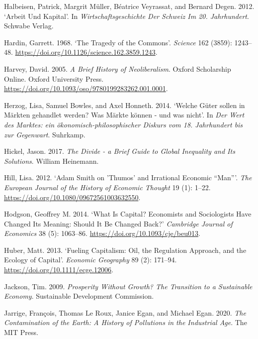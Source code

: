 \documentclass[
  british,
  a4paper,
  DIV=11,
  numbers=noendperiod,
  oneside,
  openany]{scrreprt}
\newlength{\cslhangindent}
\newenvironment{CSLReferences}[2] %
 {\begin{list}{}{%
  \setlength{\itemindent}{0pt}
  \setlength{\leftmargin}{0pt}
  \setlength{\parsep}{0pt}
  \ifodd #1
   \setlength{\leftmargin}{\cslhangindent}
   \setlength{\itemindent}{-1\cslhangindent}
  \fi
  \setlength{\itemsep}{#2\baselineskip}}}
 {\end{list}}
\begin{document}
\begin{CSLReferences}{1}{1}
Halbeisen, Patrick, Margrit Müller, Béatrice Veyrassat, and Bernard
Degen. 2012. {`Arbeit Und Kapital'}. In \emph{Wirtschaftsgeschichte Der
Schweiz Im 20. Jahrhundert}. Schwabe Verlag.

Hardin, Garrett. 1968. {`The Tragedy of the Commons'}. \emph{Science}
162 (3859): 1243--48.
\url{https://doi.org/10.1126/science.162.3859.1243}.

Harvey, David. 2005. \emph{A {Brief} {History} of {Neoliberalism}}.
Oxford Scholarship Online. Oxford University Press.
\url{https://doi.org/10.1093/oso/9780199283262.001.0001}.

Herzog, Lisa, Samuel Bowles, and Axel Honneth. 2014. {`Welche Güter
sollen in Märkten gehandlet werden? Was Märkte können - und was nicht'}.
In \emph{Der Wert des Marktes: ein ökonomisch-philosophischer Diskurs
vom 18. Jahrhundert bis zur Gegenwart}. Suhrkamp.

Hickel, Jason. 2017. \emph{The Divide - a Brief Guide to Global
Inequality and Its Solutions}. William Heinemann.

Hill, Lisa. 2012. {`Adam Smith on 'Thumos' and Irrational Economic
{``Man''}'}. \emph{The European Journal of the History of Economic
Thought} 19 (1): 1--22. \url{https://doi.org/10.1080/09672561003632550}.

Hodgson, Geoffrey M. 2014. {`What Is Capital? {Economists} and
Sociologists Have Changed Its Meaning: Should It Be Changed Back?'}
\emph{Cambridge Journal of Economics} 38 (5): 1063--86.
\url{https://doi.org/10.1093/cje/beu013}.

Huber, Matt. 2013. {`Fueling Capitalism: Oil, the Regulation Approach,
and the Ecology of Capital'}. \emph{Economic Geography} 89 (2): 171--94.
\url{https://doi.org/10.1111/ecge.12006}.

Jackson, Tim. 2009. \emph{Prosperity Without Growth? {The} Transition to
a Sustainable Economy}. Sustainable Development Commission.

Jarrige, François, Thomas Le Roux, Janice Egan, and Michael Egan. 2020.
\emph{The Contamination of the Earth: A History of Pollutions in the
Industrial Age}. The MIT Press.


\end{CSLReferences}
\end{document}
